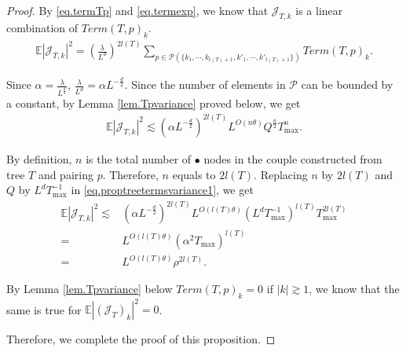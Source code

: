 \begin{proof}
By \eqref{eq.termTp} and \eqref{eq.termexp}, we know that $\mathcal{J}_{T,k}$ is a linear combination of $Term(T,p)_k$.
\begin{equation}
\begin{split}
    \mathbb{E}|\mathcal{J}_{T,k}|^2=\left(\frac{\lambda}{L^{d}}\right)^{2l(T)}
    \sum_{p\in \mathcal{P}(\{k_1,\cdots, k_{l(T)+1}, k'_1,\cdots, k'_{l(T)+1}\})} Term(T, p)_k.
\end{split}
\end{equation}

Since $\alpha=\frac{\lambda}{L^{\frac{d}{2}}}$, $\frac{\lambda}{L^{d}}=\alpha L^{-\frac{d}{2}}$. Since the number of elements in $\mathcal{P}$ can be bounded by a constant, by Lemma \ref{lem.Tpvariance} proved below, we get
\begin{equation}\label{eq.proptreetermsvariance1}
\begin{split}
    \mathbb{E}|\mathcal{J}_{T,k}|^2\lesssim (\alpha L^{-\frac{d}{2}})^{2l(T)}
    L^{O(n\theta)} Q^{\frac{n}{2}}  T^{n}_{\text{max}}  .
\end{split}
\end{equation}

By definition, $n$ is the total number of $\bullet$ nodes in the couple constructed from tree $T$ and pairing $p$. Therefore, $n$ equals to $2l(T)$.  Replacing $n$ by $2l(T)$ and $Q$ by $L^dT^{-1}_{\text{max}}$ in \eqref{eq.proptreetermsvariance1}, we get
\begin{equation}
\begin{split}
    \mathbb{E}|\mathcal{J}_{T,k}|^2\lesssim& (\alpha L^{-\frac{d}{2}})^{2l(T)}
    L^{O(l(T)\theta)} (L^dT^{-1}_{\text{max}})^{l(T)}  T_{\text{max}}^{2l(T)}  
    \\
    =& L^{O(l(T)\theta)} (\alpha^2 T_{\text{max}})^{l(T)}  
    \\
    =&  L^{O(l(T)\theta)} \rho^{2l(T)}.  
\end{split}
\end{equation}

By Lemma \ref{lem.Tpvariance} below $Term(T,p)_k=0$ if $|k|\gtrsim 1$, we know that the same is true for $\mathbb{E}|(\mathcal{J}_T)_k|^2=0$. 

Therefore, we complete the proof of this proposition.
\end{proof}


